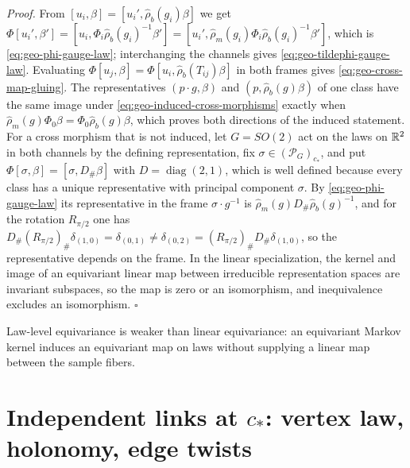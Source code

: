 \noindent\emph{Proof.}
From $[u_i,\beta]=[u_i',\widehat\rho_b(g_i)\beta]$ we get
$\Phi[u_i',\beta']=[u_i,\Phi_i\widehat\rho_b(g_i)^{-1}\beta']=[u_i',\widehat\rho_m(g_i)\Phi_i\widehat\rho_b(g_i)^{-1}\beta']$,
which is \eqref{eq:geo-phi-gauge-law}; interchanging the channels gives
\eqref{eq:geo-tildephi-gauge-law}. Evaluating $\Phi[u_j,\beta]=\Phi[u_i,\widehat\rho_b(T_{ij})\beta]$
in both frames gives \eqref{eq:geo-cross-map-gluing}. The representatives $(p\cdot g,\beta)$ and
$(p,\widehat\rho_b(g)\beta)$ of one class have the same image under
\eqref{eq:geo-induced-cross-morphisms} exactly when $\widehat\rho_m(g)\Phi_0\beta=\Phi_0\widehat\rho_b(g)\beta$,
which proves both directions of the induced statement. For a cross morphism that is not induced, let
$G=SO(2)$ act on the laws on $\mathbb R^2$ in both channels by the defining representation, fix
$\sigma\in(\mathscr P_G)_{c_*}$, and put $\Phi[\sigma,\beta]=[\sigma,D_\#\beta]$ with
$D=\operatorname{diag}(2,1)$, which is well defined because every class has a unique representative
with principal component $\sigma$. By \eqref{eq:geo-phi-gauge-law} its representative in the frame
$\sigma\cdot g^{-1}$ is $\widehat\rho_m(g)D_\#\widehat\rho_b(g)^{-1}$, and for the rotation $R_{\pi/2}$
one has $D_\#(R_{\pi/2})_\#\delta_{(1,0)}=\delta_{(0,1)}\neq\delta_{(0,2)}=(R_{\pi/2})_\#D_\#\delta_{(1,0)}$,
so the representative depends on the frame. In the linear specialization, the kernel and image of an
equivariant linear map between irreducible representation spaces are invariant subspaces, so the map is
zero or an isomorphism, and inequivalence excludes an isomorphism. \hfill$\square$

Law-level equivariance is weaker than linear equivariance: an equivariant Markov kernel induces an
equivariant map on laws without supplying a linear map between the sample fibers.

\section{Independent links at \texorpdfstring{$c_*$}{c*}: vertex law, holonomy, edge twists}
\label{sec:geo-regime-two}
\label{sec:geo-trivializing}
\label{sec:phil-agreements}

